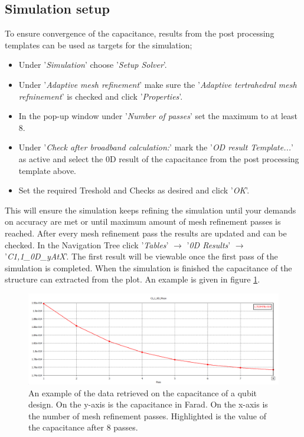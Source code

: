 \subsection{Simulation setup}
To ensure convergence of the capacitance, results from the post processing templates can be used as targets for the simulation;
\begin{itemize}
	\item Under '\textit{Simulation}' choose '\textit{Setup Solver}'.
	\item Under '\textit{Adaptive mesh refinement}' make sure the '\textit{Adaptive tertrahedral mesh refninement}' is checked and click '\textit{Properties}'.
	\item In the pop-up window under '\textit{Number of passes}' set the maximum to at least 8.
	\item Under '\textit{Check after broadband calculation:}' mark the '\textit{OD result Template...}' as active and select the 0D result of the capacitance from the post processing template above. 
	\item Set the required Treshold and Checks as desired and click '\textit{OK}'.
\end{itemize}
This will ensure the simulation keeps refining the simulation until your demands on accuracy are met or until maximum amount of mesh refinement passes is reached. After every mesh refinement pass the results are updated and can be checked. In the Navigation Tree click '\textit{Tables}' \(\rightarrow\) '\textit{0D Results}' \(\rightarrow\) '\textit{C1,1\_0D\_yAtX}'. The first result will be viewable once the first pass of the simulation is completed. When the simulation is finished the capacitance of the structure can extracted from the plot. An example is given in figure \ref{fig:capacitanceplot}.

\begin{figure}
	\includegraphics[width=\textwidth]{Figures/capacitanceplot}
	\caption{An example of the data retrieved on the capacitance of a qubit design. On the y-axis is the capacitance in Farad. On the x-axis is the number of mesh refinement passes. Highlighted is the value of the capacitance after 8 passes.}
	\label{fig:capacitanceplot}
\end{figure}


